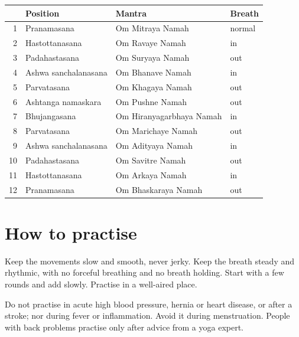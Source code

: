 \begin{table}[H]\centering\small
\begin{tabular}{@{}rlll@{}}
\toprule
& \textbf{Position} & \textbf{Mantra} & \textbf{Breath} \\
\midrule
1 & Pranamasana & Om Mitraya Namah & normal \\
2 & Hastottanasana & Om Ravaye Namah & in \\
3 & Padahastasana & Om Suryaya Namah & out \\
4 & Ashwa sanchalanasana & Om Bhanave Namah & in \\
5 & Parvatasana & Om Khagaya Namah & out \\
6 & Ashtanga namaskara & Om Pushne Namah & out \\
7 & Bhujangasana & Om Hiranyagarbhaya Namah & in \\
8 & Parvatasana & Om Marichaye Namah & out \\
9 & Ashwa sanchalanasana & Om Adityaya Namah & in \\
10 & Padahastasana & Om Savitre Namah & out \\
11 & Hastottanasana & Om Arkaya Namah & in \\
12 & Pranamasana & Om Bhaskaraya Namah & out \\
\bottomrule
\end{tabular}
\par{}
\end{table}

\section{How to practise}

Keep the movements slow and smooth, never jerky. Keep the breath steady and rhythmic, with no forceful breathing and no breath holding. Start with a few rounds and add slowly. Practise in a well-aired place.

\begin{caution}
Do not practise in acute high blood pressure, hernia or heart disease, or after a stroke; nor during fever or inflammation. Avoid it during menstruation. People with back problems practise only after advice from a yoga expert.
\end{caution}

